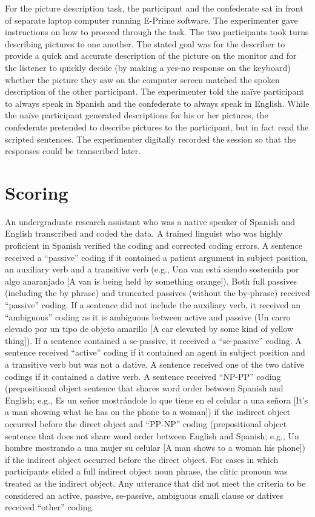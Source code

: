 For the picture description task, the participant and the confederate sat in front of separate laptop computer running E-Prime software. The experimenter gave instructions on how to proceed through the task. The two participants took turns describing pictures to one another. The stated goal was for the describer to provide a quick and accurate description of the picture on the monitor and for the listener to quickly decide (by making a yes-no response on the keyboard) whether the picture they saw on the computer screen matched the spoken description of the other participant. The experimenter told the na\"{i}ve participant to always speak in Spanish and the confederate to always speak in English. While the na\"{i}ve participant generated descriptions for his or her pictures, the confederate pretended to describe pictures to the participant, but in fact read the scripted sentences. The experimenter digitally recorded the session so that the responses could be transcribed later. 

\section{Scoring}
\label{scoring}

An undergraduate research assistant who was a native speaker of Spanish and English transcribed and coded the data. A trained linguist who was highly proficient in Spanish verified the coding and corrected coding errors. A sentence received a ``passive'' coding if it contained a patient argument in subject position, an auxiliary verb and a transitive verb (e.g., Una van est\'{a} siendo sostenida por algo anaranjado [A van is being held by something orange]). Both full passives (including the by phrase) and truncated passives (without the by-phrase) received ``passive'' coding. If a sentence did not include the auxiliary verb, it received an ``ambiguous'' coding as it is ambiguous between active and passive (Un carro elevado por un tipo de objeto amarillo [A car elevated by some kind of yellow thing]). If a sentence contained a se-passive, it received a ``se-passive'' coding. A sentence received ``active'' coding if it contained an agent in subject position and a transitive verb but was not a dative. A sentence received one of the two dative codings if it contained a dative verb. A sentence received ``NP-PP'' coding (prepositional object sentence that shares word order between Spanish and English; e.g., Es un se\~{n}or mostr\'{a}ndole lo que tiene en el celular a una se\~{n}ora [It's a man showing what he has on the phone to a woman]) if the indirect object occurred before the direct object and ``PP-NP'' coding (prepositional object sentence that does not share word order between English and Spanish; e.g., Un hombre mostrando a una mujer su celular [A man shows to a woman his phone]) if the indirect object occurred before the direct object. For cases in which participants elided a full indirect object noun phrase, the clitic pronoun was treated as the indirect object. Any utterance that did not meet the criteria to be considered an active, passive, se-passive, ambiguous small clause or datives received ``other'' coding.


